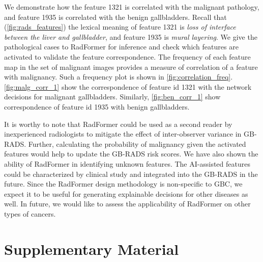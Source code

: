 \documentclass[twocolumn,final]{elsarticle}
\def\myarch{RadFormer\xspace}
\newcommand{\beginsupplement}{%
    \setcounter{table}{0}
    \renewcommand{\thetable}{S\arabic{table}}%
    \setcounter{figure}{0}
    \renewcommand{\thefigure}{S\arabic{figure}}%
 }
\begin{document}
%
\par We demonstrate how the feature 1321 is correlated with the malignant pathology, and feature 1935 is correlated with the benign gallbladders. Recall that (\cref{fig:rads_features}) the lexical meaning of feature 1321 is \emph{loss of interface between the liver and gallbladder}, and feature 1935 is \emph{mural layering}. 
We give the pathological cases to \myarch for inference and check which features are activated to validate the feature correspondence. The frequency of each feature map in the set of malignant images provides a measure of correlation of a feature with malignancy. Such a frequency plot is shown in \cref{fig:correlation_freq}. \cref{fig:malg_corr_1} show the correspondence of feature id 1321 with the network decisions for malignant gallbladders. Similarly, \cref{fig:ben_corr_1} show correspondence of feature id 1935 with benign gallbladders. 
%
\par It is worthy to note that \myarch could be used as a second reader by inexperienced radiologists to mitigate the effect of inter-observer variance in GB-RADS. Further, calculating the probability of malignancy given the activated features would help to update the GB-RADS risk scores. We have also shown the ability of \myarch in identifying unknown features. The AI-assisted features could be characterized by clinical study and integrated into the GB-RADS in the future. Since the \myarch design methodology is non-specific to GBC, we expect it to be useful for generating explainable decisions for other diseases as well. In future, we would like to assess the applicability of \myarch on other types of cancers.

\section*{Supplementary Material}

\appendix
\beginsupplement
\end{document}

